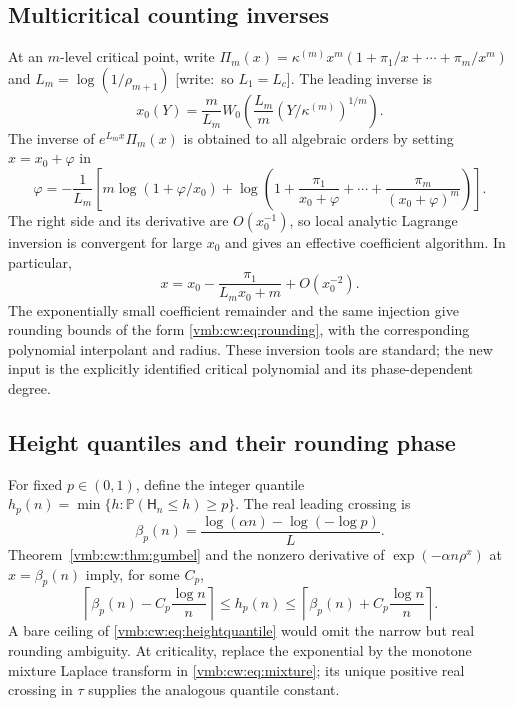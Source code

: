 \documentclass[11pt,a4paper]{article}
\numberwithin{equation}{section}
\theoremstyle{definition}\newtheorem{definition}[theorem]{Definition}
\theoremstyle{remark}\newtheorem{remark}[theorem]{Remark}
\newcommand{\Prob}{\mathbb P}
\newcommand{\wrt}[1]{\textup{[}\textsf{write:}~#1\textup{]}}
\begin{document}
\subsection{Multicritical counting inverses}
At an $m$-level critical point, write
$\Pi_m(x)=\kappa^{(m)}x^m(1+\pi_1/x+\cdots+\pi_m/x^m)$ and
$L_m=\log(1/\rho_{m+1})$ \wrt{so $L_1=L_c$}. The leading inverse is
\begin{equation}\label{vmb:cw:eq:Wmulti}
 x_0(Y)=\frac m{L_m}W_0\left(
       \frac{L_m}{m}(Y/\kappa^{(m)})^{1/m}\right).
\end{equation}
The inverse of $e^{L_mx}\Pi_m(x)$ is obtained to all algebraic orders by
setting $x=x_0+\varphi$ in
\begin{equation}\label{vmb:cw:eq:multiinverseimplicit}
 \varphi=-\frac1{L_m}\left[
 m\log(1+\varphi/x_0)+
 \log\left(1+\frac{\pi_1}{x_0+\varphi}+\cdots+
                    \frac{\pi_m}{(x_0+\varphi)^m}\right)\right].
\end{equation}
The right side and its derivative are $O(x_0^{-1})$, so local analytic
Lagrange inversion is convergent for large $x_0$ and gives an effective
coefficient algorithm. In particular,
\[
 x=x_0-\frac{\pi_1}{L_mx_0+m}+O(x_0^{-2}).
\]
The exponentially small coefficient remainder and the same injection give
rounding bounds of the form \eqref{vmb:cw:eq:rounding}, with the corresponding
polynomial interpolant and radius. These inversion tools are standard;
the new input is the explicitly identified critical polynomial and its
phase-dependent degree.

\subsection{Height quantiles and their rounding phase}
For fixed $p\in(0,1)$, define the integer quantile
$h_p(n)=\min\{h:\Prob(\mathsf H_n\le h)\ge p\}$. The real leading crossing is
\begin{equation}\label{vmb:cw:eq:heightquantile}
 \beta_p(n)=\frac{\log(\alpha n)-\log(-\log p)}L.
\end{equation}
Theorem~\ref{vmb:cw:thm:gumbel} and the nonzero derivative of
$\exp(-\alpha n\rho^x)$ at $x=\beta_p(n)$ imply, for some $C_p$,
\begin{equation}\label{vmb:cw:eq:quantilerounding}
 \left\lceil \beta_p(n)-C_p\frac{\log n}{n}\right\rceil
 \le h_p(n)\le
 \left\lceil \beta_p(n)+C_p\frac{\log n}{n}\right\rceil.
\end{equation}
A bare ceiling of \eqref{vmb:cw:eq:heightquantile} would omit the narrow but real
rounding ambiguity. At criticality, replace the exponential by the monotone
mixture Laplace transform in \eqref{vmb:cw:eq:mixture}; its unique positive real
crossing in $\tau$ supplies the analogous quantile constant.
\end{document}
